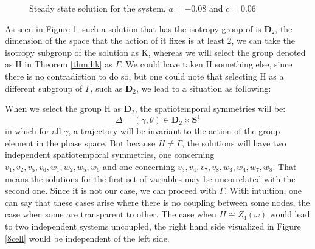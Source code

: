 \begin{figure}[h]
\centering

 




\label{fig:gait1}
\caption{Steady state solution for the system, $a = -0.08$ and $c = 0.06$}
\end{figure}

As seen in Figure \ref{fig:gait1}, such a solution that has the isotropy group of is $\mathbf{D}_2$, the dimension of the space that the action  of it fixes is at least 2, we can take the isotropy subgroup of the solution as K, whereas we will select the group denoted as H in Theorem \ref{thm:hk} as $\Gamma$. We could have taken H something else, since there is no contradiction to do so, but one could note that selecting H as a different subgroup of $\Gamma$, such as $\mathbf{D}_2$, we lead to a situation as following:

When we select the group H as $\mathbf{D}_2$, the spatiotemporal symmetries will be:
\[ \Delta = {(\gamma,\theta) \in \mathbf{D}_2 \times \mathbf{S}^1}  \] in which for all $\gamma$, a trajectory will be invariant to the action of the group element in the phase space. But because $H \neq \Gamma$, the solutions will have two independent spatiotemporal symmetries, one concerning $v_1,v_2,v_5,v_6,w_1,w_2,w_5,w_6$ and one concerning $v_3,v_4,v_7,v_8,w_3,w_4,w_7,w_8$. That means the solutions for the first set of variables may be uncorrelated with the second one. Since it is not our case, we can proceed with $\Gamma$. With intuition, one can say that these cases arise where there is no coupling between some nodes, the case when some are transparent to other. The case when $H \cong Z_4(\omega)$ would lead to two independent systems uncoupled, the right hand side visualized in Figure \ref{8cell} would be independent of the left side.

